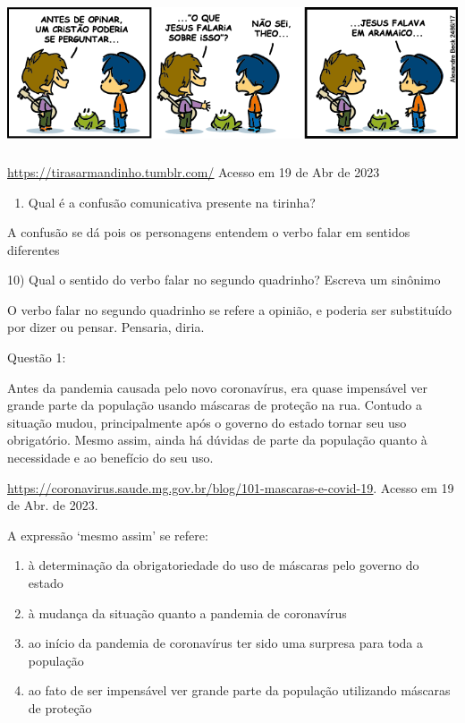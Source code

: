 {\includegraphics[width=5.90551in,height=1.72222in]{./imgSAEB_7_POR/media/image11.png}

\href{https://tirasarmandinho.tumblr.com/}{\uline{https://tirasarmandinho.tumblr.com/}}
Acesso em 19 de Abr de 2023

\begin{enumerate}
\def\labelenumi{\arabic{enumi}.}
\tightlist
\item
  Qual é a confusão comunicativa presente na tirinha?
\end{enumerate}

A confusão se dá pois os personagens entendem o verbo falar em sentidos
diferentes

10) Qual o sentido do verbo falar no segundo quadrinho? Escreva um
sinônimo

O verbo falar no segundo quadrinho se refere a opinião, e poderia ser
substituído por dizer ou pensar. Pensaria, diria.


Questão 1:

Antes da pandemia causada pelo novo coronavírus, era quase impensável
ver grande parte da população usando máscaras de proteção na rua.
Contudo a situação mudou, principalmente após o governo do estado tornar
seu uso obrigatório. Mesmo assim, ainda há dúvidas de parte da população
quanto à necessidade e ao benefício do seu uso.

\href{https://coronavirus.saude.mg.gov.br/blog/101-mascaras-e-covid-19}{\uline{https://coronavirus.saude.mg.gov.br/blog/101-mascaras-e-covid-19}}.
Acesso em 19 de Abr. de 2023.

A expressão `mesmo assim' se refere:

\begin{enumerate}
\def\labelenumi{\alph{enumi})}
\item
  à determinação da obrigatoriedade do uso de máscaras pelo governo do
  estado
\item
  à mudança da situação quanto a pandemia de coronavírus
\item
  ao início da pandemia de coronavírus ter sido uma surpresa para toda a
  população
\item
  ao fato de ser impensável ver grande parte da população utilizando
  máscaras de proteção
\end{enumerate}

}
